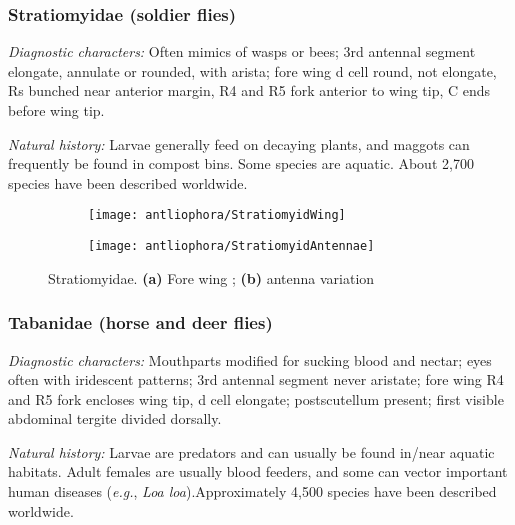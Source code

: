 \subsubsection{Stratiomyidae (soldier flies)}
\noindent{}\textit{Diagnostic characters:} Often mimics of wasps or bees; 3rd antennal segment elongate, annulate or rounded, with arista; fore wing d cell round, not elongate, Rs bunched near anterior margin, R4 and R5 fork anterior to wing tip, C ends before wing tip.\vspace{3mm}

\noindent{}\textit{Natural history:} Larvae generally feed on decaying plants, and maggots can frequently be found in compost bins. Some species are aquatic. About 2,700 species have been described worldwide.

\begin{figure}[ht!]
    \centering
    \begin{subfigure}[ht!]{0.5\textwidth}
        \texttt{[image: antliophora/StratiomyidWing]}
        \caption{}
        \label{fig:stratiomyid1}
    \end{subfigure}
    \qquad
    \begin{subfigure}[ht!]{0.2\textwidth}
        \texttt{[image: antliophora/StratiomyidAntennae]}
        \caption{}
        \label{fig:stratiomyid2}
    \end{subfigure}
    \caption{Stratiomyidae. \textbf{(a)} Fore wing \citep[][Fig. 36.33]{mcalpine1981manual}; \textbf{(b)} antenna variation \citep[][Figs. 36.9,12,15,18]{mcalpine1981manual}}\label{fig:stratiomyids}
\end{figure}

\subsubsection{Tabanidae (horse and deer flies)}
\noindent{}\textit{Diagnostic characters:} Mouthparts modified for sucking blood and nectar; eyes often with iridescent patterns; 3rd antennal segment never aristate; fore wing R4 and R5 fork encloses wing tip, d cell elongate; postscutellum present; first visible abdominal tergite divided dorsally.\vspace{3mm}

\noindent{}\textit{Natural history:} Larvae are predators and can usually be found in/near aquatic habitats. Adult females are usually blood feeders, and some can vector important human diseases (\textit{e.g.}, \textit{Loa loa}).Approximately 4,500 species have been described worldwide.

